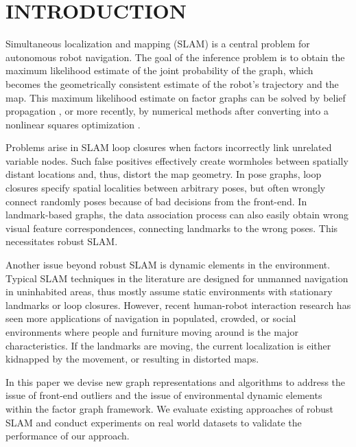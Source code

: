 \section{INTRODUCTION}

Simultaneous localization and mapping (SLAM) is a central problem for
autonomous robot navigation.  The goal of
the inference problem is to obtain the maximum likelihood estimate of the
joint probability of the graph, which becomes the geometrically consistent
estimate of the robot's trajectory and the map. This maximum likelihood estimate on factor graphs can be solved by belief propagation , or more recently, by numerical methods after converting into a nonlinear squares optimization .  

Problems arise in SLAM loop closures when factors incorrectly link unrelated variable nodes.  Such false positives effectively create wormholes between spatially distant locations and, thus, distort the map geometry. In pose graphs, loop closures specify spatial localities between arbitrary poses, but often wrongly connect randomly poses because of bad decisions from the front-end.  In landmark-based graphs, the data association process can also easily obtain wrong visual feature correspondences, connecting landmarks to the wrong poses. This necessitates robust SLAM.

Another issue beyond robust SLAM is dynamic elements in the environment.
Typical SLAM techniques in the literature are designed for unmanned navigation
in uninhabited areas, thus mostly assume static environments with stationary
landmarks or loop closures. However, recent human-robot interaction research
has seen more applications of navigation in populated, crowded, or social
environments where people and furniture moving around is the major
characteristics. If the landmarks are moving, the current localization is either
kidnapped by the movement, or resulting in distorted maps.

In this paper we devise new graph representations and algorithms to
address the issue of front-end outliers and the issue of environmental
dynamic elements within the factor graph framework. We evaluate existing
approaches of robust SLAM and conduct experiments on real world datasets to
validate the performance of our approach.

